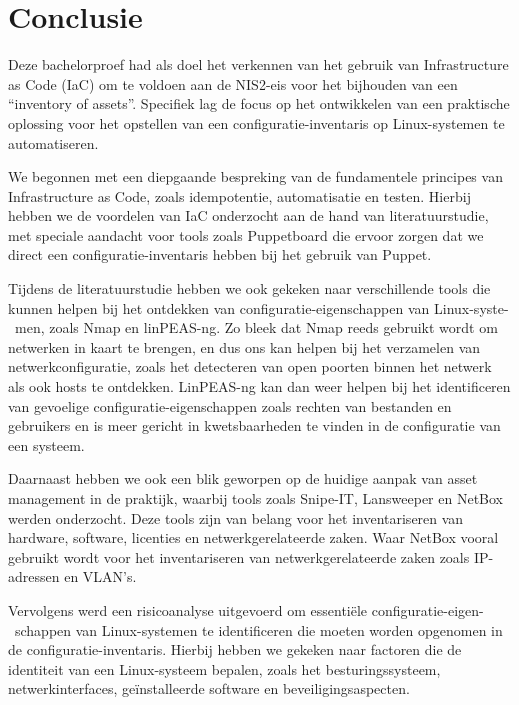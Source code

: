 
\chapter{Conclusie}%
\label{ch:conclusie}

Deze bachelorproef had als doel het verkennen van het gebruik van Infrastructure as Code (IaC) om te voldoen aan de NIS2-eis voor het bijhouden van een ``inventory of assets''.
Specifiek lag de focus op het ontwikkelen van een praktische oplossing voor het opstellen van een configuratie-inventaris op Linux-systemen te automatiseren.

We begonnen met een diepgaande bespreking van de fundamentele principes van Infrastructure as Code, zoals idempotentie, automatisatie en testen.
Hierbij hebben we de voordelen van IaC onderzocht aan de hand van literatuurstudie, met speciale aandacht voor tools zoals Puppetboard die ervoor zorgen dat we direct een configuratie-inventaris hebben bij het gebruik van Puppet.

Tijdens de literatuurstudie hebben we ook gekeken naar verschillende tools die kunnen helpen bij het ontdekken van configuratie-eigenschappen van Linux-syste-\ men, zoals Nmap en linPEAS-ng.
Zo bleek dat Nmap reeds gebruikt wordt om netwerken in kaart te brengen, en dus ons kan helpen bij het verzamelen van netwerkconfiguratie, zoals het detecteren van open poorten binnen het netwerk als ook hosts te ontdekken.
LinPEAS-ng kan dan weer helpen bij het identificeren van gevoelige configuratie-eigenschappen zoals rechten van bestanden en gebruikers en is meer gericht in kwetsbaarheden te vinden in de configuratie van een systeem.

Daarnaast hebben we ook een blik geworpen op de huidige aanpak van asset management in de praktijk, waarbij tools zoals Snipe-IT, Lansweeper en NetBox werden onderzocht.
Deze tools zijn van belang voor het inventariseren van hardware, software, licenties en netwerkgerelateerde zaken.
Waar NetBox vooral gebruikt wordt voor het inventariseren van netwerkgerelateerde zaken zoals IP-adressen en VLAN's.

Vervolgens werd een risicoanalyse uitgevoerd om essenti\"ele configuratie-eigen-\ schappen van Linux-systemen te identificeren die moeten worden opgenomen in de configuratie-inventaris.
Hierbij hebben we gekeken naar factoren die de identiteit van een Linux-systeem bepalen, zoals het besturingssysteem, netwerkinterfaces, ge\"installeerde software en beveiligingsaspecten.

